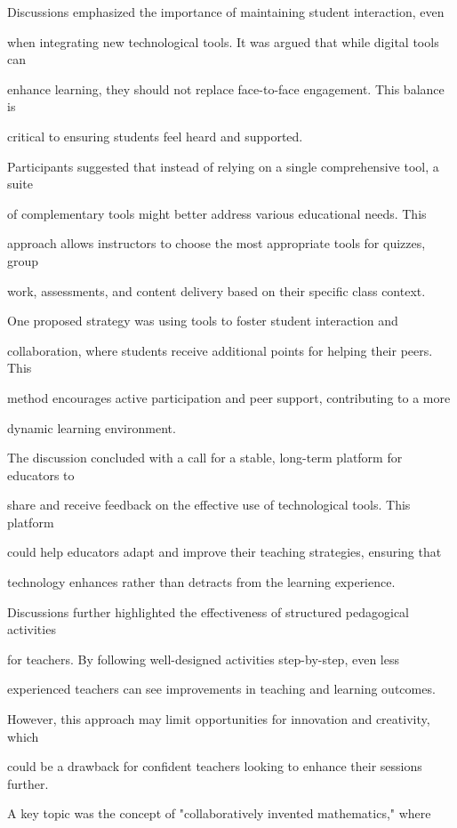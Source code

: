 \documentclass[11pt]{article}
\begin{document}
Discussions emphasized the importance of maintaining student interaction, even

when integrating new technological tools. It was argued that while digital tools can

enhance learning, they should not replace face-to-face engagement. This balance is

critical to ensuring students feel heard and supported.

Participants suggested that instead of relying on a single comprehensive tool, a suite

of complementary tools might better address various educational needs. This

approach allows instructors to choose the most appropriate tools for quizzes, group

work, assessments, and content delivery based on their specific class context.

One proposed strategy was using tools to foster student interaction and

collaboration, where students receive additional points for helping their peers. This

method encourages active participation and peer support, contributing to a more

dynamic learning environment.

The discussion concluded with a call for a stable, long-term platform for educators to

share and receive feedback on the effective use of technological tools. This platform

could help educators adapt and improve their teaching strategies, ensuring that

technology enhances rather than detracts from the learning experience.

Discussions further highlighted the effectiveness of structured pedagogical activities

for teachers. By following well-designed activities step-by-step, even less

experienced teachers can see improvements in teaching and learning outcomes.

However, this approach may limit opportunities for innovation and creativity, which

could be a drawback for confident teachers looking to enhance their sessions further.

A key topic was the concept of "collaboratively invented mathematics," where
\end{document}
